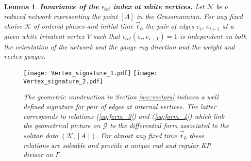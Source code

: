 \documentclass[11pt]{amsart}
\theoremstyle{plain}
\numberwithin{equation}{section}
\newtheorem{lemma}[theorem]{Lemma}
\begin{document}
\begin{lemma}\label{lem:adm_2}\textbf{Invariance of the $\epsilon_{tot}$ index at white vertices.}
Let $\mathcal N$ be a reduced network representing the point $[A]$ in the Grassmannian. For any fixed choice  $\mathcal K$ of ordered phases and initial time $\vec t_0$ the pair of edges $e_i$, $e_{i+1}$ at a given white trivalent vertex $V$ such that $\epsilon_{tot}(e_i,e_{i+1})=1$ is independent on both the orientation of the network and the gauge ray direction and the weight and vertex gauges.
\end{lemma}

\begin{figure}%
  \centering
  \texttt{[image: Vertex\_signature\_1.pdf]}
	\hfill
	\texttt{[image: Vertex\_signature\_2.pdf]}
  \vspace{-2.7 truecm}
  \caption{\small{\sl The geometric construction in Section \ref{sec:vectors} induces a well defined signature for pair of edges at internal vertices. The latter corresponds to relations (\ref{eq:form_3}) and (\ref{eq:form_4}) which link the geometrical picture on $\mathcal G$ to the differential form associated to the soliton data $(\mathcal K, [A])$. For almost any fixed time $\vec t_0$ these relations are solvable and provide a unique real and regular KP divisor on $\Gamma$.}}
	\label{fig:vert_sign}
\end{figure}
\end{document}
